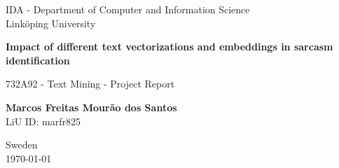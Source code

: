 \begin{titlepage}
	\begin{center}
		\vspace*{1cm}
		
		\large
		IDA - Department of Computer and Information Science\\
		Linköping University
		
		\vspace{5cm}
		
		\LARGE
		\textbf{Impact of different text vectorizations and embeddings in sarcasm identification}
		
		\Large
		732A92 - Text Mining - Project Report
	
		\vspace{2cm}
		
		\textbf{Marcos Freitas Mourão dos Santos}\\
		LiU ID: marfr825
		
		\vfill
		
		Sweden\\
		\today
		
	\end{center}
\end{titlepage}
